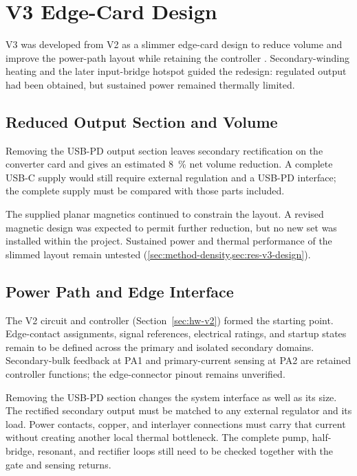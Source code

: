 \section{V3 Edge-Card Design}
\label{sec:hw-v3-plan}

V3 was developed from V2 as a slimmer edge-card design to reduce volume
and improve the power-path layout while retaining the controller
\cite{projectOctoberPlan}. Secondary-winding heating and the later
input-bridge hotspot guided the redesign: regulated output had been
obtained, but sustained power remained thermally limited.

\subsection{Reduced Output Section and Volume}

Removing the USB-PD output section leaves secondary rectification on the
converter card and gives an estimated \SI{8}{\percent} net volume reduction.
A complete USB-C supply would still require external regulation and a
USB-PD interface; the complete supply must be compared with those parts included.

The supplied planar magnetics continued to constrain the layout. A revised
magnetic design was expected to permit further reduction, but no new set
was installed within the project. Sustained power and thermal performance
of the slimmed layout remain untested
(\cref{sec:method-density,sec:res-v3-design}).

\subsection{Power Path and Edge Interface}

The V2 circuit and controller (Section~\ref{sec:hw-v2}) formed the starting
point. Edge-contact assignments, signal references, electrical ratings,
and startup states remain to be defined across the primary and isolated
secondary domains. Secondary-bulk feedback at PA1 and primary-current
sensing at PA2 are retained controller functions; the edge-connector
pinout remains unverified.

Removing the USB-PD section changes the system interface as well as its
size. The rectified secondary output must be matched to any external
regulator and its load. Power contacts, copper, and interlayer connections
must carry that current without creating another local thermal bottleneck.
The complete pump, half-bridge, resonant, and rectifier loops still need
to be checked together with the gate and sensing returns.

